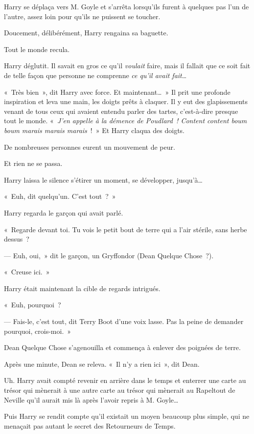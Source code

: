 Harry se déplaça vers M. Goyle et s'arrêta lorsqu'ils furent à quelques pas l'un de l'autre, assez loin pour qu'ils ne puissent se toucher.

Doucement, délibérément, Harry rengaina sa baguette.

Tout le monde recula.

Harry déglutit. Il savait en gros ce qu'il \emph{voulait} faire, mais il fallait que ce soit fait de telle façon que personne ne comprenne \emph{ce qu'il avait fait}…

«~Très bien~», dit Harry avec force. Et maintenant…~» Il prit une profonde inspiration et leva une main, les doigts prêts à claquer. Il y eut des glapissements venant de tous ceux qui avaient entendu parler des tartes, c'est-à-dire presque tout le monde. «~\emph{J'en appelle à la démence de Poudlard~! Content content boum boum marais marais marais}~!~» Et Harry claqua des doigts.

De nombreuses personnes eurent un mouvement de peur.

Et rien ne se passa.

Harry laissa le silence s'étirer un moment, se développer, jusqu'à…

«~Euh, dit quelqu'un. C'est tout~?~»

Harry regarda le garçon qui avait parlé.

«~Regarde devant toi. Tu vois le petit bout de terre qui a l'air stérile, sans herbe dessus~?

--- Euh, oui,~» dit le garçon, un Gryffondor (Dean Quelque Chose~?).

«~Creuse ici.~»

Harry était maintenant la cible de regards intrigués.

«~Euh, pourquoi~?

--- Fais-le, c'est tout, dit Terry Boot d'une voix lasse. Pas la peine de demander pourquoi, crois-moi.~»

Dean Quelque Chose s'agenouilla et commença à enlever des poignées de terre.

Après une minute, Dean se releva. «~Il n'y a rien ici~», dit Dean.

Uh. Harry avait compté revenir en arrière dans le temps et enterrer une carte au trésor qui mènerait à une autre carte au trésor qui mènerait au Rapeltout de Neville qu'il aurait mis là après l'avoir repris à M. Goyle…

Puis Harry se rendit compte qu'il existait un moyen beaucoup plus simple, qui ne menaçait pas autant le secret des Retourneurs de Temps.

